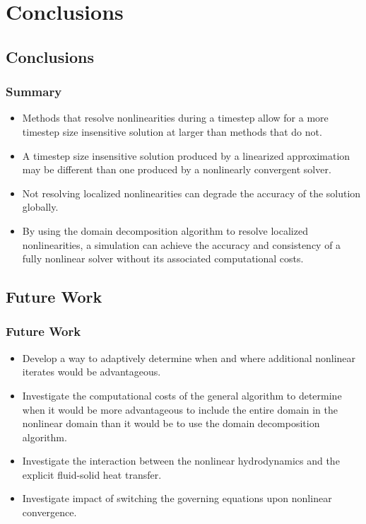 \documentclass[compress,xcolor=table]{beamer}
\begin{document}
\section[Conclusions]{Conclusions}
\subsection[Conclusions]{Conclusions}
\begin{frame}
\frametitle{Summary}

\begin{itemize}
\item{Methods that resolve nonlinearities during a timestep allow for a more timestep size insensitive solution at larger \dtmax{} than methods that do not.}
\item{A timestep size insensitive solution produced by a linearized approximation may be different than one produced by a nonlinearly convergent solver.}
\item{Not resolving localized nonlinearities can degrade the accuracy of the solution globally.}
\item{By using the domain decomposition algorithm to resolve localized nonlinearities, a simulation can achieve the accuracy and consistency of a fully nonlinear solver without its associated computational costs.}
\end{itemize}

\end{frame}
\subsection[Future Work]{Future Work}
\begin{frame}
\frametitle{Future Work}

\begin{itemize}
\item{Develop a way to adaptively determine when and where additional nonlinear iterates would be advantageous.}
\item{Investigate the computational costs of the general algorithm to determine when it would be more advantageous to include the entire domain in the nonlinear domain than it would be to use the domain decomposition algorithm.}
\item{Investigate the interaction between the nonlinear hydrodynamics and the explicit fluid-solid heat transfer.}
\item{Investigate impact of switching the governing equations upon nonlinear convergence.}
\end{itemize}

\end{frame}
\end{document}
